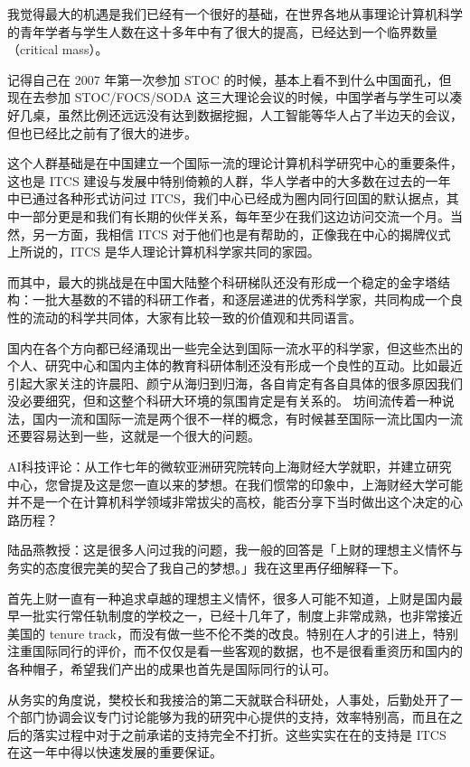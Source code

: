 我觉得最大的机遇是我们已经有一个很好的基础，在世界各地从事理论计算机科学的青年学者与学生人数在这十多年中有了很大的提高，已经达到一个临界数量（critical mass）。

记得自己在 2007 年第一次参加 STOC 的时候，基本上看不到什么中国面孔，但现在去参加 STOC/FOCS/SODA 这三大理论会议的时候，中国学者与学生可以凑好几桌，虽然比例还远远没有达到数据挖掘，人工智能等华人占了半边天的会议，但也已经比之前有了很大的进步。

这个人群基础是在中国建立一个国际一流的理论计算机科学研究中心的重要条件，这也是 ITCS 建设与发展中特别倚赖的人群，华人学者中的大多数在过去的一年中已通过各种形式访问过 ITCS，我们中心已经成为圈内同行回国的默认据点，其中一部分更是和我们有长期的伙伴关系，每年至少在我们这边访问交流一个月。当然，另一方面，我相信 ITCS 对于他们也是有帮助的，正像我在中心的揭牌仪式上所说的，ITCS 是华人理论计算机科学家共同的家园。

而其中，最大的挑战是在中国大陆整个科研梯队还没有形成一个稳定的金字塔结构：一批大基数的不错的科研工作者，和逐层递进的优秀科学家，共同构成一个良性的流动的科学共同体，大家有比较一致的价值观和共同语言。

国内在各个方向都已经涌现出一些完全达到国际一流水平的科学家，但这些杰出的个人、研究中心和国内主体的教育科研体制还没有形成一个良性的互动。比如最近引起大家关注的许晨阳、颜宁从海归到归海，各自肯定有各自具体的很多原因我们没必要细究，但和这整个科研大环境的氛围肯定是有关系的。 坊间流传着一种说法，国内一流和国际一流是两个很不一样的概念，有时候甚至国际一流比国内一流还要容易达到一些，这就是一个很大的问题。

AI科技评论：从工作七年的微软亚洲研究院转向上海财经大学就职，并建立研究中心，您曾提及这是您一直以来的梦想。在我们惯常的印象中，上海财经大学可能并不是一个在计算机科学领域非常拔尖的高校，能否分享下当时做出这个决定的心路历程？

陆品燕教授：这是很多人问过我的问题，我一般的回答是「上财的理想主义情怀与务实的态度很完美的契合了我自己的梦想。」我在这里再仔细解释一下。

首先上财一直有一种追求卓越的理想主义情怀，很多人可能不知道，上财是国内最早一批实行常任轨制度的学校之一，已经十几年了，制度上非常成熟，也非常接近美国的 tenure track，而没有做一些不伦不类的改良。特别在人才的引进上，特别注重国际同行的评价，而不仅仅是看一些客观的数据，也不是很看重资历和国内的各种帽子，希望我们产出的成果也首先是国际同行的认可。

从务实的角度说，樊校长和我接洽的第二天就联合科研处，人事处，后勤处开了一个部门协调会议专门讨论能够为我的研究中心提供的支持，效率特别高，而且在之后的落实过程中对于之前承诺的支持完全不打折。这些实实在在的支持是 ITCS 在这一年中得以快速发展的重要保证。

